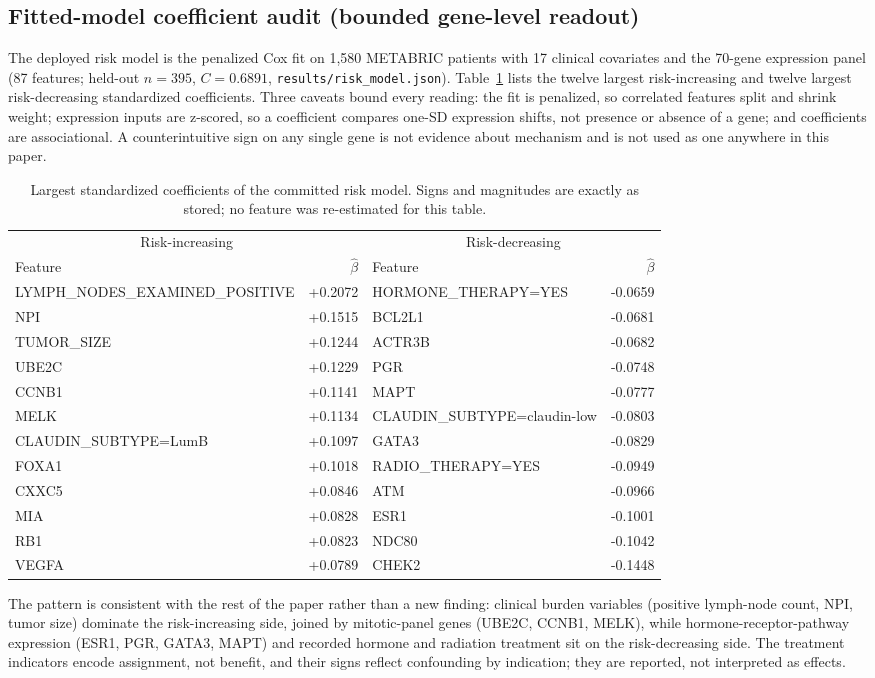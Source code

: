 \subsection{Fitted-model coefficient audit (bounded gene-level readout)}
The deployed risk model is the penalized Cox fit on 1,580 METABRIC patients with 17 clinical covariates and the 70-gene expression panel (87 features; held-out $n=395$, $C=0.6891$, \texttt{results/risk\_model.json}). Table~\ref{tab:coef-audit} lists the twelve largest risk-increasing and twelve largest risk-decreasing standardized coefficients. Three caveats bound every reading: the fit is penalized, so correlated features split and shrink weight; expression inputs are z-scored, so a coefficient compares one-SD expression shifts, not presence or absence of a gene; and coefficients are associational. A counterintuitive sign on any single gene is not evidence about mechanism and is not used as one anywhere in this paper.
\begin{table}[htbp]\centering\footnotesize
\begin{tabular}{lr|lr}\hline
\multicolumn{2}{c|}{Risk-increasing} & \multicolumn{2}{c}{Risk-decreasing} \\ 
Feature & $\hat\beta$ & Feature & $\hat\beta$ \\ \hline
LYMPH\_NODES\_EXAMINED\_POSITIVE & +0.2072 & HORMONE\_THERAPY=YES & -0.0659 \\
NPI & +0.1515 & BCL2L1 & -0.0681 \\
TUMOR\_SIZE & +0.1244 & ACTR3B & -0.0682 \\
UBE2C & +0.1229 & PGR & -0.0748 \\
CCNB1 & +0.1141 & MAPT & -0.0777 \\
MELK & +0.1134 & CLAUDIN\_SUBTYPE=claudin-low & -0.0803 \\
CLAUDIN\_SUBTYPE=LumB & +0.1097 & GATA3 & -0.0829 \\
FOXA1 & +0.1018 & RADIO\_THERAPY=YES & -0.0949 \\
CXXC5 & +0.0846 & ATM & -0.0966 \\
MIA & +0.0828 & ESR1 & -0.1001 \\
RB1 & +0.0823 & NDC80 & -0.1042 \\
VEGFA & +0.0789 & CHEK2 & -0.1448 \\
\hline\end{tabular}
\caption{Largest standardized coefficients of the committed risk model. Signs and magnitudes are exactly as stored; no feature was re-estimated for this table.}\label{tab:coef-audit}
\end{table}
The pattern is consistent with the rest of the paper rather than a new finding: clinical burden variables (positive lymph-node count, NPI, tumor size) dominate the risk-increasing side, joined by mitotic-panel genes (UBE2C, CCNB1, MELK), while hormone-receptor-pathway expression (ESR1, PGR, GATA3, MAPT) and recorded hormone and radiation treatment sit on the risk-decreasing side. The treatment indicators encode assignment, not benefit, and their signs reflect confounding by indication; they are reported, not interpreted as effects.
